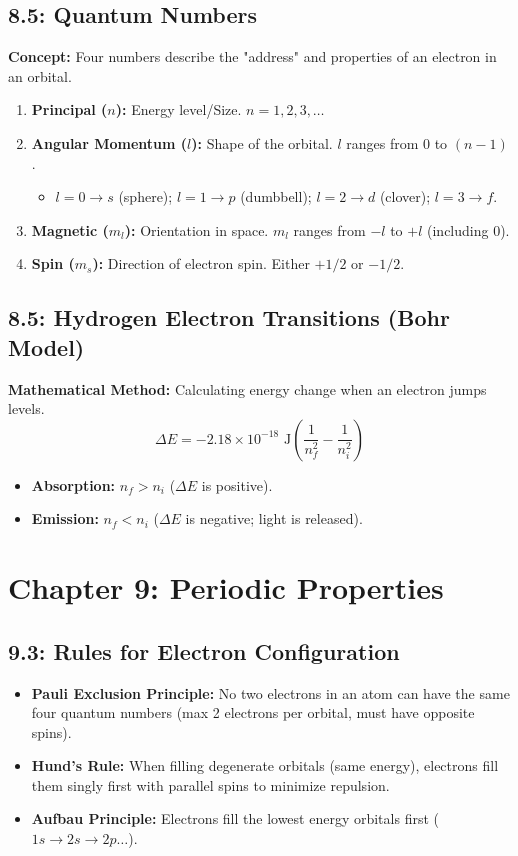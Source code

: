 \documentclass[11pt]{article}
\begin{document}
\subsection{8.5: Quantum Numbers}
\textbf{Concept:} Four numbers describe the "address" and properties of an electron in an orbital.
\begin{enumerate}
    \item \textbf{Principal ($n$):} Energy level/Size. $n = 1, 2, 3, \dots$
    \item \textbf{Angular Momentum ($l$):} Shape of the orbital. $l$ ranges from $0$ to $(n-1)$.
    \begin{itemize}
        \item $l=0 \rightarrow s$ (sphere); $l=1 \rightarrow p$ (dumbbell); $l=2 \rightarrow d$ (clover); $l=3 \rightarrow f$.
    \end{itemize}
    \item \textbf{Magnetic ($m_l$):} Orientation in space. $m_l$ ranges from $-l$ to $+l$ (including 0).
    \item \textbf{Spin ($m_s$):} Direction of electron spin. Either $+1/2$ or $-1/2$.
\end{enumerate}

\subsection{8.5: Hydrogen Electron Transitions (Bohr Model)}
\textbf{Mathematical Method:} Calculating energy change when an electron jumps levels.
\[ \Delta E = -2.18 \times 10^{-18} \text{ J} \left( \frac{1}{n_f^2} - \frac{1}{n_i^2} \right) \]
\begin{itemize}
    \item \textbf{Absorption:} $n_f > n_i$ ($\Delta E$ is positive).
    \item \textbf{Emission:} $n_f < n_i$ ($\Delta E$ is negative; light is released).
\end{itemize}

\newpage

\section{Chapter 9: Periodic Properties}

\subsection{9.3: Rules for Electron Configuration}
\begin{itemize}
    \item \textbf{Pauli Exclusion Principle:} No two electrons in an atom can have the same four quantum numbers (max 2 electrons per orbital, must have opposite spins).
    \item \textbf{Hund's Rule:} When filling degenerate orbitals (same energy), electrons fill them singly first with parallel spins to minimize repulsion.
    \item \textbf{Aufbau Principle:} Electrons fill the lowest energy orbitals first ($1s \rightarrow 2s \rightarrow 2p \dots$).
\end{itemize}
\end{document}
